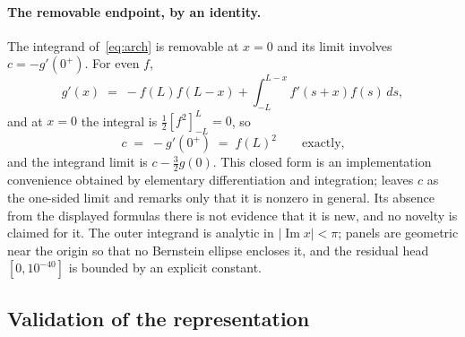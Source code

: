 \documentclass[11pt,a4paper]{article}
\theoremstyle{definition}
\theoremstyle{remark}
\begin{document}
\paragraph{The removable endpoint, by an identity.} The integrand
of~\eqref{eq:arch} is removable at $x = 0$ and its limit involves
$c = -g'(0^{+})$. For even $f$,
\[
   g'(x) \;=\; -f(L) f(L-x) + \int_{-L}^{L-x} f'(s+x) f(s)\, ds ,
\]
and at $x = 0$ the integral is $\tfrac12[f^2]_{-L}^{L} = 0$, so
\begin{equation}
\label{eq:c}
   c \;=\; -g'(0^{+}) \;=\; f(L)^2 \qquad\text{exactly,}
\end{equation}
and the integrand limit is $c - \tfrac32 g(0)$. This closed form is an
implementation convenience obtained by elementary differentiation and
integration; \cite[Lemma 2.5]{Zhu} leaves $c$ as the one-sided limit and remarks
only that it is nonzero in general. Its absence from the displayed formulas
there is not evidence that it is new, and no novelty is claimed for it. The outer integrand is analytic
in $|\operatorname{Im} x| < \pi$; panels are geometric near the origin so that no
Bernstein ellipse encloses it, and the residual head $[0,10^{-40}]$ is bounded
by an explicit constant.

\subsection{Validation of the representation}
\end{document}
